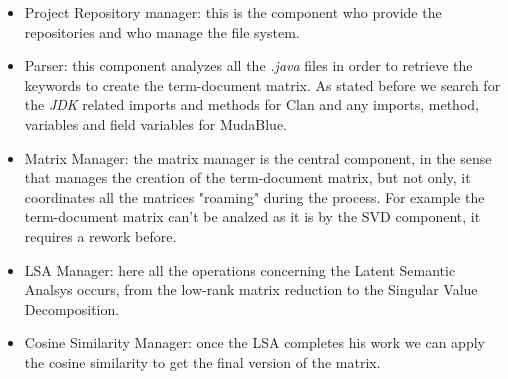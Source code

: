 \begin{itemize}
	\item Project Repository manager: this is the component who provide the repositories and who manage the file system.
	\item Parser: this component analyzes all the \emph{.java} files in order to retrieve the keywords to create the term-document matrix. As stated before we search for the \emph{JDK} related imports and methods for Clan and any imports, method, variables and field variables for MudaBlue.
	\item Matrix Manager: the matrix manager is the central component, in the sense that manages the creation of the term-document matrix, but not only, it coordinates all the matrices "roaming" during the process. For example the term-document matrix can't be analzed as it is by the SVD component, it requires a rework before.
	\item LSA Manager: here all the operations concerning the Latent Semantic Analsys occurs, from the low-rank matrix reduction to the Singular Value Decomposition.
	\item Cosine Similarity Manager: once the LSA completes his work we can apply the cosine similarity to get the final version of the matrix.
\end{itemize}

